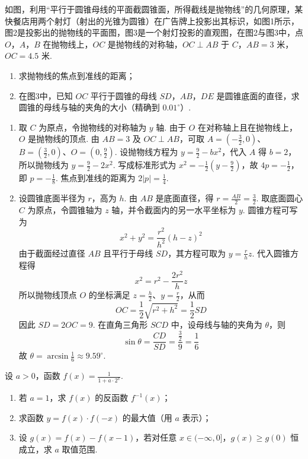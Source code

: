 \begin{problem}
如图，利用“平行于圆锥母线的平面截圆锥面，所得截线是抛物线”的几何原理，某快餐店用两个射灯（射出的光锥为圆锥）在广告牌上投影出其标识，如图1所示，图2是投影出的抛物线的平面图，图3是一个射灯投影的直观图，在图2与图3中，点 \(O\)，\(A\)，\(B\) 在抛物线上，\(OC\) 是抛物线的对称轴，\(OC\perp AB\) 于 \(C\)，\(AB=3\) 米，\(OC=4.5\) 米.

\begin{enumerate}
\item 求抛物线的焦点到准线的距离；
\item 在图3中，已知 \(OC\) 平行于圆锥的母线 \(SD\)，\(AB\)，\(DE\) 是圆锥底面的直径，求圆锥的母线与轴的夹角的大小（精确到 \(0.01^\circ\)）.
\end{enumerate}

\end{problem}

\begin{solution}
\begin{enumerate}
\item 取 \(C\) 为原点，令抛物线的对称轴为 \(y\) 轴. 由于 \(O\) 在对称轴上且在抛物线上，\(O\) 是抛物线的顶点. 由 \(AB=3\) 及 \(OC\perp AB\)，可取 \(A=(-\frac32,0)\)、\(B=(\frac32,0)\)、\(O=(0,\frac92)\). 设抛物线方程为 \(y=\frac92-bx^2\)，代入 \(A\) 得 \(b=2\)，所以抛物线为 \(y=\frac92-2x^2\). 写成标准形式为 \(x^2=-\frac12(y-\frac92)\)，故 \(4p=-\frac12\)，即 \(p=-\frac18\). 焦点到准线的距离为 \(2\lvert p\rvert=\frac14\).
\item 设圆锥底面半径为 \(r\)，高为 \(h\). 由 \(AB\) 是底面直径，得 \(r=\frac{AB}{2}=\frac{3}{2}\). 取底面圆心 \(C\) 为原点，令圆锥轴为 \(z\) 轴，并令截面内的另一水平坐标为 \(y\). 圆锥方程可写为
\[
x^2+y^2=\frac{r^2}{h^2}(h-z)^2
\]
由于截面经过直径 \(AB\) 且平行于母线 \(SD\)，其方程可取为 \(y=\frac rhz\). 代入圆锥方程得
\[
x^2=r^2-\frac{2r^2}{h}z
\]
所以抛物线顶点 \(O\) 的坐标满足 \(z=\frac{h}{2}\)、\(y=\frac{r}{2}\)，从而
\[
OC=\frac12\sqrt{r^2+h^2}=\frac12SD
\]
因此 \(SD=2OC=9\). 在直角三角形 \(SCD\) 中，设母线与轴的夹角为 \(\theta\)，则
\[
\sin\theta=\frac{CD}{SD}=\frac{\frac{3}{2}}{9}=\frac16
\]
故 \(\theta=\arcsin\frac16\approx9.59^\circ\).
\end{enumerate}
\end{solution}

\begin{problem}
设 \(a>0\)，函数 \(f(x)=\frac{1}{1+a\cdot2^x}\).

\begin{enumerate}
\item 若 \(a=1\)，求 \(f(x)\) 的反函数 \(f^{-1}(x)\)；
\item 求函数 \(y=f(x)\cdot f(-x)\) 的最大值（用 \(a\) 表示）；
\item 设 \(g(x)=f(x)-f(x-1)\)，若对任意 \(x\in(-\infty,0]\)，\(g(x)\ge g(0)\) 恒成立，求 \(a\) 取值范围.
\end{enumerate}
\end{problem}

